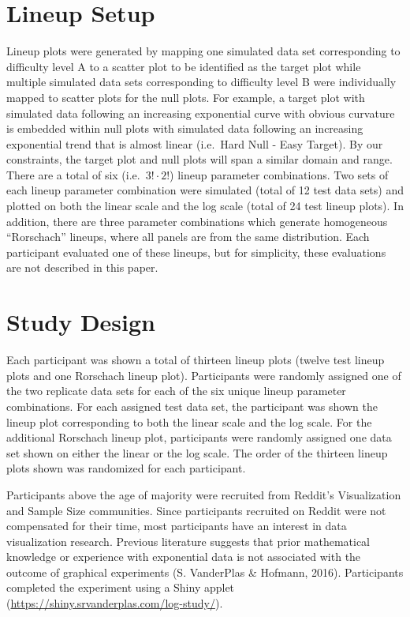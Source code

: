 \documentclass[print]{nuthesis}
\begin{document}
\hypertarget{lineup-setup}{%
\section{Lineup Setup}\label{lineup-setup}}

Lineup plots were generated by mapping one simulated data set corresponding to difficulty level A to a scatter plot to be identified as the target plot while multiple simulated data sets corresponding to difficulty level B were individually mapped to scatter plots for the null plots.
For example, a target plot with simulated data following an increasing exponential curve with obvious curvature is embedded within null plots with simulated data following an increasing exponential trend that is almost linear (i.e.~Hard Null - Easy Target).
By our constraints, the target plot and null plots will span a similar domain and range.
There are a total of six (i.e.~\(3!\cdot 2!\)) lineup parameter combinations.
Two sets of each lineup parameter combination were simulated (total of 12 test data sets) and plotted on both the linear scale and the log scale (total of 24 test lineup plots).
In addition, there are three parameter combinations which generate homogeneous ``Rorschach'' lineups, where all panels are from the same distribution. Each participant evaluated one of these lineups, but for simplicity, these evaluations are not described in this paper.

\hypertarget{study-design}{%
\section{Study Design}\label{study-design}}

Each participant was shown a total of thirteen lineup plots (twelve test lineup plots and one Rorschach lineup plot). Participants were randomly assigned one of the two replicate data sets for each of the six unique lineup parameter combinations. For each assigned test data set, the participant was shown the lineup plot corresponding to both the linear scale and the log scale. For the additional Rorschach lineup plot, participants were randomly assigned one data set shown on either the linear or the log scale. The order of the thirteen lineup plots shown was randomized for each participant.

Participants above the age of majority were recruited from Reddit's Visualization and Sample Size communities.
Since participants recruited on Reddit were not compensated for their time, most participants have an interest in data visualization research.
Previous literature suggests that prior mathematical knowledge or experience with exponential data is not associated with the outcome of graphical experiments (S. VanderPlas \& Hofmann, 2016).
Participants completed the experiment using a Shiny applet (\url{https://shiny.srvanderplas.com/log-study/}).
\end{document}
